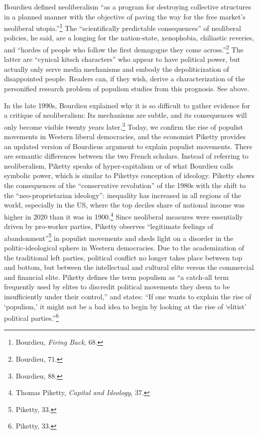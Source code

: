 \documentclass{tufte-handout}
\begin{document}
{{{{Bourdieu defined neoliberalism ``as a program for destroying collective
structures in a planned manner with the objective of paving the way for
the free market's neoliberal utopia.''\footnote{Bourdieu, \emph{Firing
  Back}, 68.} The ``scientifically predictable consequences'' of
neoliberal policies, he said, are a longing for the nation-state,
xenophobia, chiliastic reveries, and ``hordes of people who follow the
first demagogue they come across.''\footnote{Bourdieu, 71.} The latter
are ``cynical kitsch characters'' who appear to have political power,
but actually only serve media mechanisms and embody the depoliticization
of disappointed people. Readers can, if they wish, derive a
characterization of the personified research problem of populism studies
from this prognosis. See above.

In the late 1990s, Bourdieu explained why it is so difficult to gather
evidence for a critique of neoliberalism: Its mechanisms are subtle, and
its consequences will only become visible twenty years later.\footnote{Bourdieu,
  88.} Today, we confirm the rise of populist movements in Western
liberal democracies, and the economist Piketty provides an updated
version of Bourdieu\textquotesingle s argument to explain populist
movements. There are semantic differences between the two French
scholars. Instead of referring to neoliberalism, Piketty speaks of
hyper-capitalism or of what Bourdieu calls symbolic power, which is
similar to Piketty\textquotesingle s conception of ideology. Piketty
shows the consequences of the ``conservative revolution'' of the 1980s
with the shift to the ``neo-proprietarian ideology'': inequality has
increased in all regions of the world, especially in the US, where the
top decile\textquotesingle s share of national income was higher in 2020
than it was in 1900.\footnote{Thomas Piketty, \emph{Capital and
  Ideology}, 37.} Since neoliberal measures were essentially driven by
pro-worker parties, Piketty observes ``legitimate feelings of
abandonment''\footnote{Piketty, 33.} in populist movements and sheds
light on a disorder in the politic-ideological sphere in Western
democracies. Due to the academization of the traditional left parties,
political conflict no longer takes place between top and bottom, but
between the intellectual and cultural elite versus the commercial and
financial elite. Piketty defines the term populism as ``a catch-all term
frequently used by elites to discredit political movements they deem to
be insufficiently under their control,'' and states: ``If one wants to
explain the rise of `populism,' it might not be a bad idea to begin by
looking at the rise of `elitist' political parties.''\footnote{Piketty,
  33.}

}}}}
\end{document}
